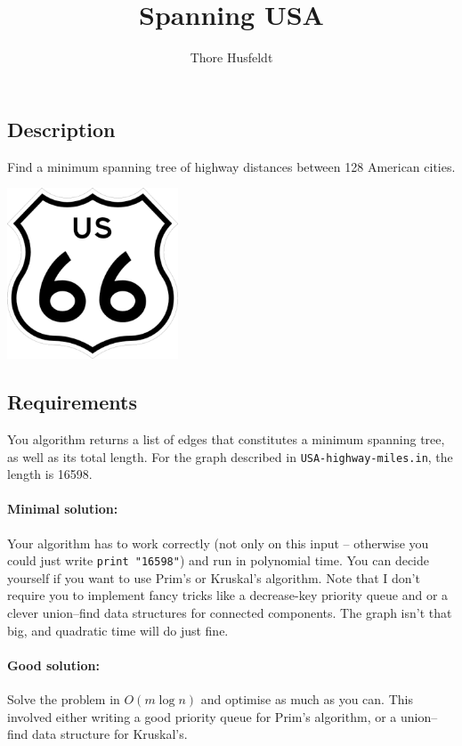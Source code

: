 \documentclass{tufte-handout}
\title{Spanning USA}
\author{Thore Husfeldt}
\begin{document}
\maketitle

\subsection{Description}
Find a minimum spanning tree of highway distances between 128 American cities.

\begin{marginfigure}
\includegraphics[width=2in]{us66.png}
\end{marginfigure}

\subsection{Requirements}

You algorithm returns a list of edges that constitutes a minimum spanning tree, as well as its total length.
For the graph described in \verb!USA-highway-miles.in!, the length is 16598.

\paragraph{Minimal solution:} Your algorithm has to work correctly (not only on this input -- otherwise you could just write \verb!print "16598"!) and run in polynomial time. 
You can decide yourself if you want to use Prim's or Kruskal's algorithm. 
Note that I don’t require you to implement fancy tricks like a decrease-key priority queue and or a clever union–find data structures for connected components. 
The graph isn’t that big, and quadratic time will do just fine.


\paragraph{Good solution:}
Solve the problem in $O(m\log n)$ and optimise as much as you can. 
This involved either writing a good priority queue for Prim's algorithm, or a union–find data structure for Kruskal's. 
\end{document}
